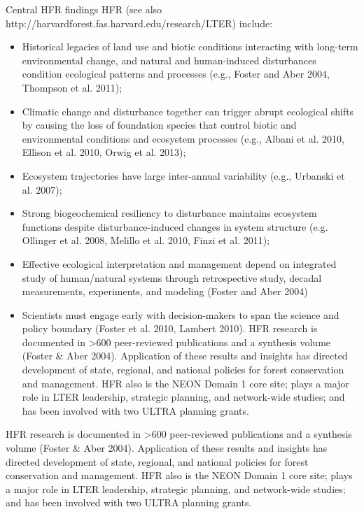 \documentclass[10pt]{article}
\begin{document}
Central HFR findings HFR (see also http://harvardforest.fas.harvard.edu/research/LTER) include:
\begin{itemize} 
	\item Historical legacies of land use and biotic conditions 
          interacting with long-term environmental change, and natural
          and human-induced disturbances condition ecological patterns
          and processes (e.g., Foster and Aber 2004, Thompson et
          al. 2011);

	\item Climatic change and disturbance together can trigger
          abrupt ecological shifts by causing the loss of foundation
          species that control biotic and environmental conditions and
          ecosystem processes (e.g., Albani et al. 2010, Ellison et
          al. 2010, Orwig et al. 2013);

	\item Ecosystem trajectories have large inter-annual 
          variability (e.g., Urbanski et al. 2007);
	\item Strong biogeochemical resiliency to disturbance
          maintains ecosystem functions despite disturbance-induced
          changes in system structure (e.g. Ollinger et al. 2008,
          Melillo et al. 2010, Finzi et al. 2011);

	\item Effective ecological interpretation and management
          depend on integrated study of human/natural systems through
          retrospective study, decadal measurements, experiments, and
          modeling (Foster and Aber 2004)

	\item Scientists must engage early with decision-makers to
          span the science and policy boundary (Foster et al. 2010,
          Lambert 2010).  HFR research is documented in >600
          peer-reviewed publications and a synthesis volume (Foster \&
          Aber 2004). Application of these results and insights has
          directed development of state, regional, and national
          policies for forest conservation and management. HFR also is
          the NEON Domain 1 core site; plays a major role in LTER
          leadership, strategic planning, and network-wide studies;
          and has been involved with two ULTRA planning grants.

\end{itemize}

HFR research is documented in >600 peer-reviewed publications and a
synthesis volume (Foster \& Aber 2004). Application of these results
and insights has directed development of state, regional, and national
policies for forest conservation and management. HFR also is the NEON
Domain 1 core site; plays a major role in LTER leadership, strategic
planning, and network-wide studies; and has been involved with two
ULTRA planning grants.
\end{document}
